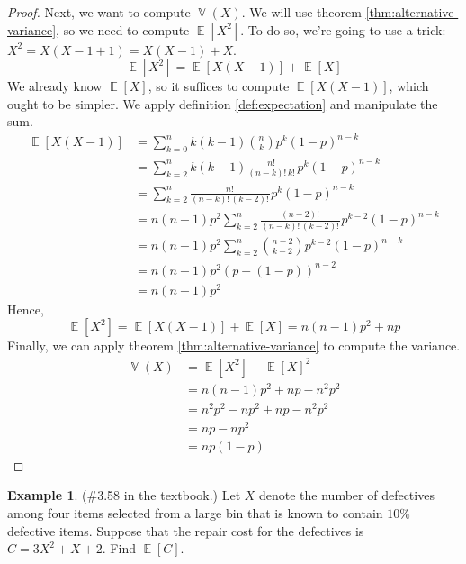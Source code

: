 \documentclass[11pt]{article}
\theoremstyle{definition}
\newtheorem{eg}{Example}
\theoremstyle{remark}
\newcommand{\parens}[1]{\left(#1\right)}
\newcommand{\fact}{!\,}
\DeclareMathOperator{\Expect}{\mathbb{E}}
\newcommand{\E}[1]{\Expect{\left[#1\right]}}
\DeclareMathOperator{\Var}{\mathbb{V}}
\newcommand{\V}[1]{\Var{\parens{#1}}}
\begin{document}
\begin{proof}
    Next, we want to compute $\V{X}$.
    We will use theorem \ref{thm:alternative-variance}, so we need to compute
    $\E{X^2}$.
    To do so, we're going to use a trick: $X^2 = X(X - 1 + 1) = X(X-1) + X$.
    \begin{equation*}
        \E{X^2} = \E{X(X-1)} + \E{X}
    \end{equation*}
    We already know $\E{X}$, so it suffices to compute $\E{X(X-1)}$, which
    ought to be simpler. We apply definition \ref{def:expectation} and
    manipulate the sum.
    \begin{align*}
        \E{X(X-1)}
        &= \sum_{k=0}^n {
            k(k-1) {n \choose k} p^k (1-p)^{n-k}
        } \\
        &= \sum_{k=2}^n {
            k(k-1)
            \frac{n\fact}{(n-k)\fact k\fact}
            p^k (1-p)^{n-k}
        } \\
        &= \sum_{k=2}^n {
            \frac{n\fact}{(n-k)\fact (k-2)\fact}
            p^k (1-p)^{n-k}
        } \\
        &= n(n-1) p^2 \sum_{k=2}^n {
            \frac{(n-2)\fact}{(n-k)\fact (k-2)\fact}
            p^{k-2}
            (1-p)^{n-k}
        } \\
        &= n(n-1) p^2 \sum_{k=2}^n {
            {{n-2} \choose {k-2}} p^{k-2} (1-p)^{n-k}
        } \\
        &= n(n-1) p^2 (p + (1-p))^{n-2} \\
        &= n(n-1) p^2
    \end{align*}
    Hence,
    \begin{equation}
        \label{eq:bin-xx1}
        \E{X^2} = \E{X(X-1)} + \E{X} = n(n-1) p^2 + np
    \end{equation}
    Finally, we can apply theorem \ref{thm:alternative-variance} to compute the
    variance.
    \begin{align*}
        \label{eq:variance-binomial}
        \V{X}
        &= \E{X^2} - \E{X}^2 \\
        &= n(n-1) p^2 + np - n^2 p^2 \\
        &= n^2 p^2 - n p^2 + np - n^2 p^2 \\
        &= np - np^2 \\
        &= np(1-p)
    \end{align*}
\end{proof}

\begin{eg}{(\#3.58 in the textbook.)}
    Let $X$ denote the number of defectives among four items selected from a
    large bin that is known to contain $10\%$ defective items.
    Suppose that the repair cost for the defectives is $C = 3X^2 + X + 2$.
    Find $\E{C}$.
\end{eg}
\end{document}
